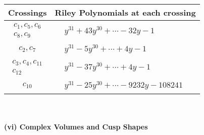 \documentclass[1p]{elsarticle_modified}
\theoremstyle{definition}
\begin{document}
\begin{tabular}{m{50pt}|m{274pt}}
Crossings & \hspace{64pt}Riley Polynomials at each crossing \\
\hline $$\begin{aligned}c_{1},c_{5},c_{6}\\c_{8},c_{9}\end{aligned}$$&$\begin{aligned}
&y^{31}+43 y^{30}+\cdots-32 y-1
\end{aligned}$\\
\hline $$\begin{aligned}c_{2},c_{7}\end{aligned}$$&$\begin{aligned}
&y^{31}-5 y^{30}+\cdots+4 y-1
\end{aligned}$\\
\hline $$\begin{aligned}c_{3},c_{4},c_{11}\\c_{12}\end{aligned}$$&$\begin{aligned}
&y^{31}-37 y^{30}+\cdots+4 y-1
\end{aligned}$\\
\hline $$\begin{aligned}c_{10}\end{aligned}$$&$\begin{aligned}
&y^{31}-25 y^{30}+\cdots-9232 y-108241
\end{aligned}$\\
\hline
\end{tabular}\\~\\
\newpage\flushleft \textbf{(vi) Complex Volumes and Cusp Shapes}
\end{document}
